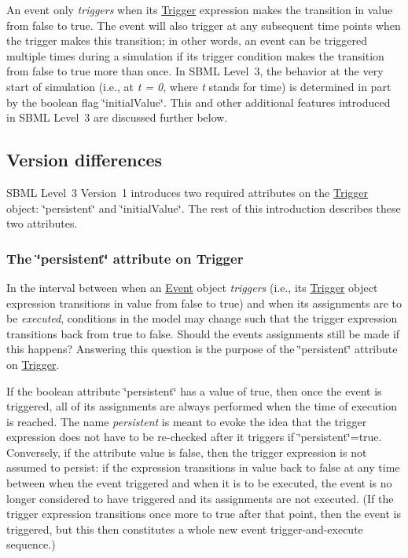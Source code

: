 An event only {\itshape triggers} when its \hyperlink{class_trigger}{Trigger} expression makes the transition in value from {\ttfamily false} to {\ttfamily true}. The event will also trigger at any subsequent time points when the trigger makes this transition; in other words, an event can be triggered multiple times during a simulation if its trigger condition makes the transition from {\ttfamily false} to {\ttfamily true} more than once. In S\+B\+ML Level~3, the behavior at the very start of simulation (i.\+e., at {\itshape t = 0}, where {\itshape t} stands for time) is determined in part by the boolean flag \char`\"{}initial\+Value\char`\"{}. This and other additional features introduced in S\+B\+ML Level~3 are discussed further below.\hypertarget{class_trigger_trigger-version-diffs}{}\subsection{Version differences}\label{class_trigger_trigger-version-diffs}
S\+B\+ML Level~3 Version~1 introduces two required attributes on the \hyperlink{class_trigger}{Trigger} object\+: \char`\"{}persistent\char`\"{} and \char`\"{}initial\+Value\char`\"{}. The rest of this introduction describes these two attributes.\hypertarget{class_trigger_trigger-persistent}{}\subsubsection{The \char`\"{}persistent\char`\"{} attribute on Trigger}\label{class_trigger_trigger-persistent}
In the interval between when an \hyperlink{class_event}{Event} object {\itshape triggers} (i.\+e., its \hyperlink{class_trigger}{Trigger} object expression transitions in value from {\ttfamily false} to {\ttfamily true}) and when its assignments are to be {\itshape executed}, conditions in the model may change such that the trigger expression transitions back from {\ttfamily true} to {\ttfamily false}. Should the event\textquotesingle{}s assignments still be made if this happens? Answering this question is the purpose of the \char`\"{}persistent\char`\"{} attribute on \hyperlink{class_trigger}{Trigger}.

If the boolean attribute \char`\"{}persistent\char`\"{} has a value of {\ttfamily true}, then once the event is triggered, all of its assignments are always performed when the time of execution is reached. The name {\itshape persistent} is meant to evoke the idea that the trigger expression does not have to be re-\/checked after it triggers if \char`\"{}persistent\char`\"{}={\ttfamily true}. Conversely, if the attribute value is {\ttfamily false}, then the trigger expression is not assumed to persist\+: if the expression transitions in value back to {\ttfamily false} at any time between when the event triggered and when it is to be executed, the event is no longer considered to have triggered and its assignments are not executed. (If the trigger expression transitions once more to {\ttfamily true} after that point, then the event is triggered, but this then constitutes a whole new event trigger-\/and-\/execute sequence.)

